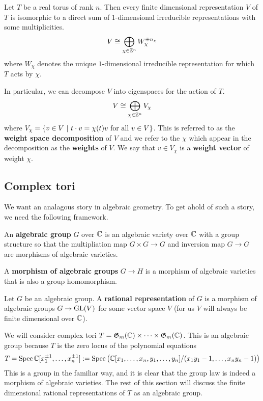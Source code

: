 \documentclass[12pt]{article}
\begin{document}
\begin{theorem}
    Let $T$ be a real torus of rank $n$. Then every finite dimensional representation $V$ of $T$ is isomorphic 
    to a direct sum of $1$-dimensional irreducible representations with some multiplicities.
    \begin{align*}
        V \cong \bigoplus_{\chi\in \mathbb{Z}^n} W_\chi^{\oplus n_\chi}
    \end{align*} where $W_\chi$ denotes the unique $1$-dimensional irreducible representation for which $T$ acts by $\chi$.
\end{theorem}

In particular, we can decompose $V$ into eigenspaces for the action of $T$. \begin{align*}
    V \cong \bigoplus_{\chi\in\mathbb{Z}^n} V_\chi
\end{align*} where $V_\chi = \{v\in V \ \vert \  t\cdot v = \chi(t)v \text{ for all $v\in V$}\}$. This is
referred to as the \textbf{weight space decomposition} of $V$ and we refer to the $\chi$ which appear in 
the decomposition as the \textbf{weights} of $V$. 
We say that $v\in V_\chi$ is a \textbf{weight vector} of weight $\chi$.


\subsection{Complex tori}
We want an analagous story in algebraic geometry. To get ahold of such a story, 
we need the following framework.
\begin{definition}
    An \textbf{algebraic group} $G$ over $\mathbb{C}$ is an algebraic variety over $\mathbb{C}$ with a group structure
    so that the multipliation map $G\times G\to G$ and inversion map $G\to G$ are morphisms
    of algebraic varieties.
\end{definition}

\begin{definition}
    A \textbf{morphism of algebraic groups} $G\to H$ is a morphism of algebraic varieties that is also a group homomorphism.
\end{definition}

\begin{definition}
    Let $G$ be an algebraic group. A \textbf{rational representation} of $G$ is a morphism of algebraic groups
    $G\to \operatorname{GL}(V)$ for some vector space $V$ (for us $V$ will always be finite dimensional over $\mathbb{C}$). 
\end{definition}

We will consider complex tori $T = \mathfrak{G}_m(\mathbb{C})\times\cdots\times\mathfrak{G}_m(\mathbb{C})$.
This is an algebraic group because $T$ is the zero locus of 
the polynomial equations \begin{align*}
    T = \operatorname{Spec} \mathbb{C}[x_1^{\pm 1},\ldots, x_n^{\pm 1}] := \operatorname{Spec}\big(\mathbb{C}[x_1,\dots,x_n,y_1,\dots,y_n]/(x_1y_1-1,\dots,x_ny_n-1)\big)
\end{align*} This is a group in the familiar way, 
and it is clear that the group law is indeed a morphism of algebraic varieties. The rest of this section will discuss 
the finite dimensional rational representations of $T$ as an algebraic group.
\end{document}
